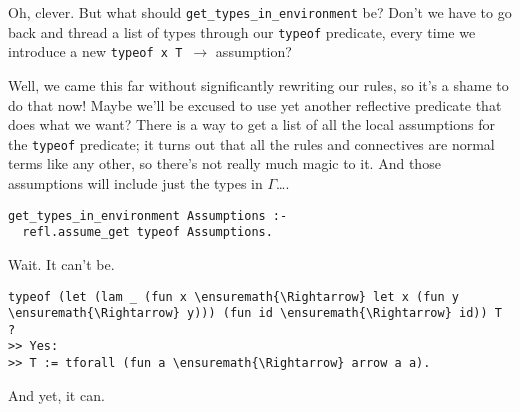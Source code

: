 \identDialog

\heroSTUDENT{} Oh, clever. But what should
\texttt{get\_types\_in\_environment} be? Don't we have to go back and
thread a list of types through our \texttt{typeof} predicate, every time
we introduce a new \texttt{typeof\ x\ T\ \ensuremath{\to}} assumption?

\heroADVISOR{} Well, we came this far without significantly rewriting our
rules, so it's a shame to do that now! Maybe we'll be excused to use yet
another reflective predicate that does what we want? There is a way to
get a list of all the local assumptions for the \texttt{typeof}
predicate; it turns out that all the rules and connectives are normal
\lamprolog terms like any other, so there's not really much magic to it.
And those assumptions will include just the types in \(\Gamma\)\ldots{}.

\begin{verbatim}
get_types_in_environment Assumptions :-
  refl.assume_get typeof Assumptions.
\end{verbatim}

\heroSTUDENT{} Wait. It can't be.

\begin{verbatim}
typeof (let (lam _ (fun x \ensuremath{\Rightarrow} let x (fun y \ensuremath{\Rightarrow} y))) (fun id \ensuremath{\Rightarrow} id)) T ?
>> Yes:
>> T := tforall (fun a \ensuremath{\Rightarrow} arrow a a).
\end{verbatim}

\heroADVISOR{} And yet, it can.
